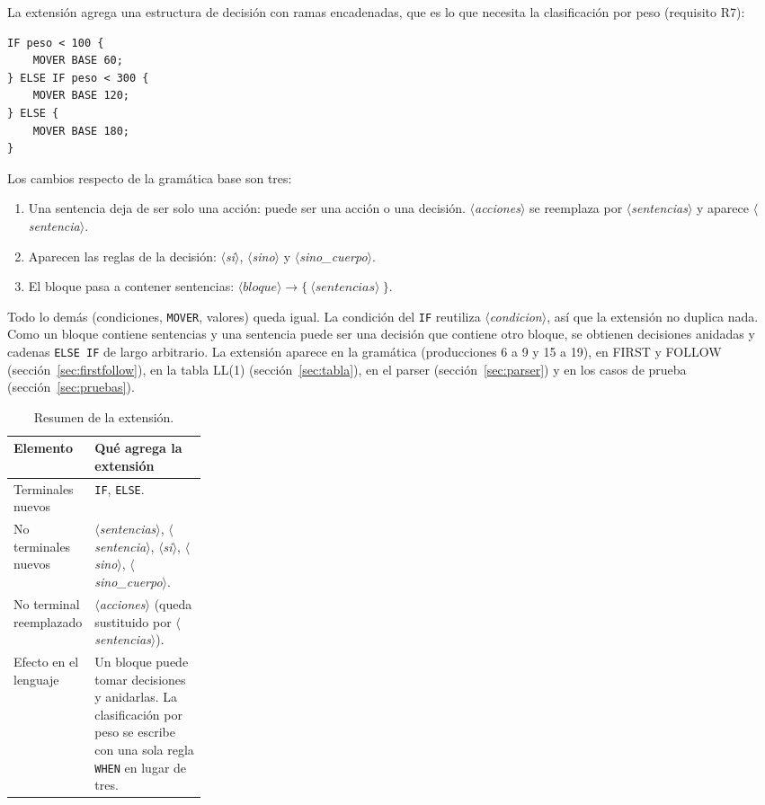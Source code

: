 \documentclass[10pt,a4paper]{article}
\newcommand{\nt}[1]{\ensuremath{\langle}\textit{#1}\ensuremath{\rangle}}   %
\newcommand{\tm}[1]{\texttt{#1}}                                          %
\begin{document}
La extensión agrega una estructura de decisión con ramas encadenadas, que es lo que necesita
la clasificación por peso (requisito R7):

\begin{lstlisting}
IF peso < 100 {
    MOVER BASE 60;
} ELSE IF peso < 300 {
    MOVER BASE 120;
} ELSE {
    MOVER BASE 180;
}
\end{lstlisting}

Los cambios respecto de la gramática base son tres:

\begin{enumerate}[nosep]
\item Una sentencia deja de ser solo una acción: puede ser una acción o una decisión.
\nt{acciones} se reemplaza por \nt{sentencias} y aparece \nt{sentencia}.
\item Aparecen las reglas de la decisión: \nt{si}, \nt{sino} y \nt{sino\_cuerpo}.
\item El bloque pasa a contener sentencias: $\nt{bloque} \rightarrow \tm{\{}\ \nt{sentencias}\ \tm{\}}$.
\end{enumerate}

Todo lo demás (condiciones, \tm{MOVER}, valores) queda igual. La condición del \tm{IF}
reutiliza \nt{condicion}, así que la extensión no duplica nada. Como un bloque contiene
sentencias y una sentencia puede ser una decisión que contiene otro bloque, se obtienen
decisiones anidadas y cadenas \tm{ELSE IF} de largo arbitrario. La extensión aparece en
la gramática (producciones 6 a 9 y 15 a 19), en FIRST y FOLLOW (sección~\ref{sec:firstfollow}),
en la tabla LL(1) (sección~\ref{sec:tabla}), en el parser (sección~\ref{sec:parser}) y en
los casos de prueba (sección~\ref{sec:pruebas}).

\begin{table}[H]
\centering\small
\begin{tabularx}{\linewidth}{|L{0.25\linewidth}|X|}
\hline
\textbf{Elemento} & \textbf{Qué agrega la extensión} \\
\hline
Terminales nuevos & \tm{IF}, \tm{ELSE}. \\
\hline
No terminales nuevos & \nt{sentencias}, \nt{sentencia}, \nt{si}, \nt{sino}, \nt{sino\_cuerpo}. \\
\hline
No terminal reemplazado & \nt{acciones} (queda sustituido por \nt{sentencias}). \\
\hline
Efecto en el lenguaje & Un bloque puede tomar decisiones y anidarlas. La clasificación por peso se escribe con una sola regla \tm{WHEN} en lugar de tres. \\
\hline
\end{tabularx}
\caption{Resumen de la extensión.}
\label{tab:extension}
\end{table}
\end{document}
